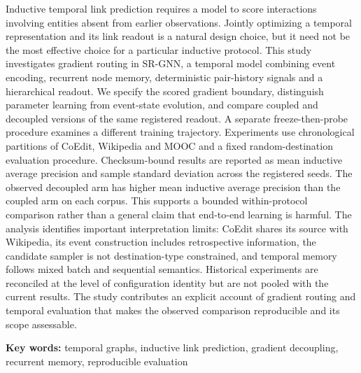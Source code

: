 \documentclass[a4paper,10pt]{article}
\begin{document}
\begin{list}{}{\setlength{\leftmargin}{2cm}\setlength{\rightmargin}{2cm}}\item[]
Inductive temporal link prediction requires a model to score interactions involving entities absent from earlier observations. Jointly optimizing a temporal representation and its link readout is a natural design choice, but it need not be the most effective choice for a particular inductive protocol. This study investigates gradient routing in SR-GNN, a temporal model combining event encoding, recurrent node memory, deterministic pair-history signals and a hierarchical readout. We specify the scored gradient boundary, distinguish parameter learning from event-state evolution, and compare coupled and decoupled versions of the same registered readout. A separate freeze-then-probe procedure examines a different training trajectory. Experiments use chronological partitions of CoEdit, Wikipedia and MOOC and a fixed random-destination evaluation procedure. Checksum-bound results are reported as mean inductive average precision and sample standard deviation across the registered seeds. The observed decoupled arm has higher mean inductive average precision than the coupled arm on each corpus. This supports a bounded within-protocol comparison rather than a general claim that end-to-end learning is harmful. The analysis identifies important interpretation limits: CoEdit shares its source with Wikipedia, its event construction includes retrospective information, the candidate sampler is not destination-type constrained, and temporal memory follows mixed batch and sequential semantics. Historical experiments are reconciled at the level of configuration identity but are not pooled with the current results. The study contributes an explicit account of gradient routing and temporal evaluation that makes the observed comparison reproducible and its scope assessable.

\vspace{10pt}\noindent\textbf{Key words:} temporal graphs, inductive link prediction, gradient decoupling, recurrent memory, reproducible evaluation
\end{list}
\clearpage
\end{document}

